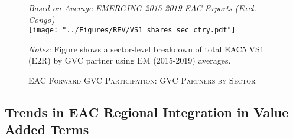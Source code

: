 \documentclass[a4paper]{article}
\begin{document}
\begin{figure}[h!] 
\centering
\caption{\label{fig:EACVS1_ctry_sec}\textsc{EAC Forward GVC Participation: GVC Partners by Sector}}
\small{\textit{Based on Average EMERGING 2015-2019 EAC Exports (Excl. Congo)}} \\
\vspace{1mm}
\texttt{[image: "../Figures/REV/VS1\_shares\_sec\_ctry.pdf"]} \\ \raggedright
\scriptsize
\vspace{-1mm}
\emph{Notes:} Figure shows a sector-level breakdown of total EAC5 VS1 (E2R) by GVC partner using EM (2015-2019) averages. %
\end{figure}
\FloatBarrier



\subsection{Trends in EAC Regional Integration in Value Added Terms}
\end{document}
